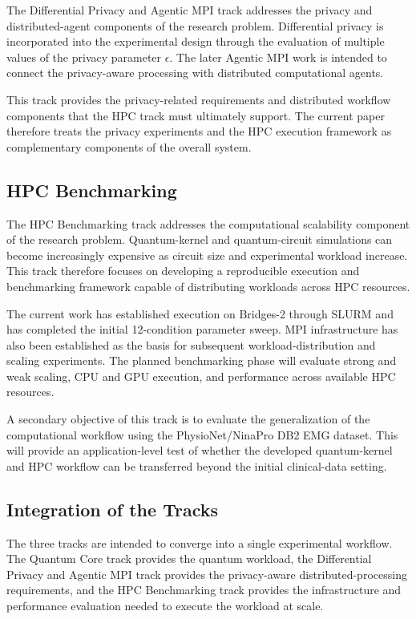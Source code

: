 \documentclass[pdflatex,sn-mathphys-num]{sn-jnl}%
\theoremstyle{thmstyleone}%
\theoremstyle{thmstyletwo}%
\theoremstyle{thmstylethree}%
\begin{document}
The Differential Privacy and Agentic MPI track addresses the privacy and distributed-agent components of the research problem. Differential privacy is incorporated into the experimental design through the evaluation of multiple values of the privacy parameter $\epsilon$. The later Agentic MPI work is intended to connect the privacy-aware processing with distributed computational agents.

This track provides the privacy-related requirements and distributed workflow components that the HPC track must ultimately support. The current paper therefore treats the privacy experiments and the HPC execution framework as complementary components of the overall system.

\subsection{HPC Benchmarking}\label{subsec:hpc-track}

The HPC Benchmarking track addresses the computational scalability component of the research problem. Quantum-kernel and quantum-circuit simulations can become increasingly expensive as circuit size and experimental workload increase. This track therefore focuses on developing a reproducible execution and benchmarking framework capable of distributing workloads across HPC resources.

The current work has established execution on Bridges-2 through SLURM and has completed the initial 12-condition parameter sweep. MPI infrastructure has also been established as the basis for subsequent workload-distribution and scaling experiments. The planned benchmarking phase will evaluate strong and weak scaling, CPU and GPU execution, and performance across available HPC resources.

A secondary objective of this track is to evaluate the generalization of the computational workflow using the PhysioNet/NinaPro DB2 EMG dataset. This will provide an application-level test of whether the developed quantum-kernel and HPC workflow can be transferred beyond the initial clinical-data setting.

\subsection{Integration of the Tracks}\label{subsec:track-integration}

The three tracks are intended to converge into a single experimental workflow. The Quantum Core track provides the quantum workload, the Differential Privacy and Agentic MPI track provides the privacy-aware distributed-processing requirements, and the HPC Benchmarking track provides the infrastructure and performance evaluation needed to execute the workload at scale.
\end{document}
